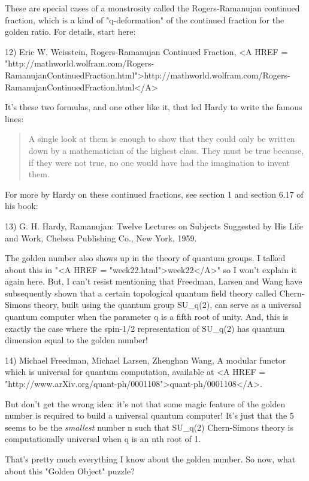 $$
    
These are special cases of a monstrosity called the Rogers-Ramanujan
continued fraction, which is a kind of "q-deformation" of 
the continued fraction for the golden ratio.  For details, start here:

12) Eric W. Weisstein, Rogers-Ramanujan Continued Fraction,
<A HREF = "http://mathworld.wolfram.com/Rogers-RamanujanContinuedFraction.html">http://mathworld.wolfram.com/Rogers-RamanujanContinuedFraction.html</A> 

It's these two formulas, and one other like it, that led
Hardy to write the famous lines:

\begin{quote}
A single look at them is enough to show that they
could only be written down by a mathematician of the highest
class.  They must be true because, if they were not true,
no one would have had the imagination to invent them.  
\end{quote}
    

For more by Hardy on these continued fractions, see section 1 and
section 6.17 of his book:

13) G. H. Hardy, Ramanujan: Twelve Lectures on Subjects Suggested
by His Life and Work, Chelsea Publishing Co., New York, 1959.

The golden number also shows up in the theory of quantum groups.  
I talked about this in "<A HREF = "week22.html">week22</A>" so 
I won't explain it again here.  
But, I can't resist mentioning that Freedman, Larsen and Wang have
subsequently shown that a certain topological quantum field theory 
called Chern-Simons theory, built using the quantum group SU_{q}(2), 
can serve as a universal quantum computer when the parameter q is a 
fifth root of unity.  And, this is exactly the case where the spin-1/2 
representation of SU_{q}(2) 
has quantum dimension equal to the golden number!  

14) Michael Freedman, Michael Larsen, Zhenghan Wang, 
A modular functor which is universal for quantum computation,
available at <A HREF = "http://www.arXiv.org/quant-ph/0001108">quant-ph/0001108</A>.

But don't get the wrong idea: it's not that some magic feature of the 
golden number is required to build a universal quantum computer!  It's 
just that the 5 seems to be the \emph{smallest} 
number n such that SU_{q}(2)
Chern-Simons theory is computationally universal when q is an nth root of 1.

That's pretty much everything I know about the golden number.  So now, 
what about this "Golden Object" puzzle? 

